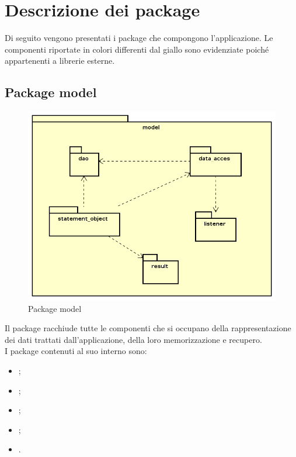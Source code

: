 \documentclass[../Tesi.tex]{subfiles}
\begin{document}
\section{Descrizione dei package}\label{sec:descrizioneDeiPackage}
Di seguito vengono presentati i package che compongono l'applicazione. Le componenti riportate in colori differenti dal giallo sono evidenziate poiché appartenenti a librerie esterne.

	\subsection{Package model}
		\begin{figure}[H]
			\centering
			\includegraphics[scale=0.6]{images/package_diagrams/model}
				\caption{Package model}
		\end{figure}
		Il package  racchiude tutte le componenti che si occupano della rappresentazione dei dati trattati dall'applicazione, della loro memorizzazione e recupero. \\
		I package contenuti al suo interno sono:
		\begin{itemize}
			\item {};
			\item {};
			\item {};
			\item {};
			\item {}.
		\end{itemize}
\end{document}
